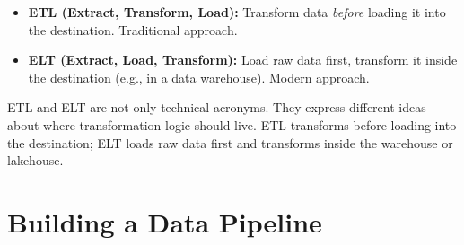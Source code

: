 \documentclass[12pt, a4paper, oneside]{book}
\begin{document}
\begin{itemize}[leftmargin=2em]
    \item \textbf{ETL (Extract, Transform, Load):} Transform data \emph{before} loading it into the destination. Traditional approach.
    \item \textbf{ELT (Extract, Load, Transform):} Load raw data first, transform it inside the destination (e.g., in a data warehouse). Modern approach.
\end{itemize}

\begin{intuitionbox}
ETL and ELT are not only technical acronyms. They express different ideas about where transformation logic should live. ETL transforms before loading into the destination; ELT loads raw data first and transforms inside the warehouse or lakehouse.
\end{intuitionbox}

\section{Building a Data Pipeline}
\end{document}
